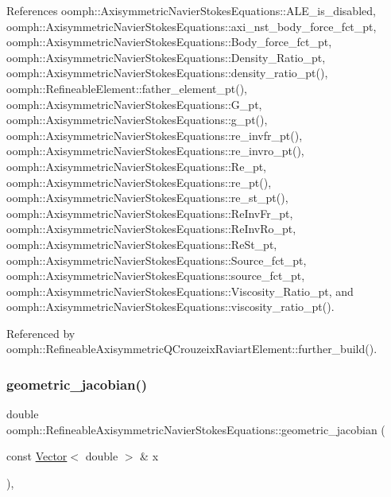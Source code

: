 References oomph\+::\+Axisymmetric\+Navier\+Stokes\+Equations\+::\+A\+L\+E\+\_\+is\+\_\+disabled, oomph\+::\+Axisymmetric\+Navier\+Stokes\+Equations\+::axi\+\_\+nst\+\_\+body\+\_\+force\+\_\+fct\+\_\+pt, oomph\+::\+Axisymmetric\+Navier\+Stokes\+Equations\+::\+Body\+\_\+force\+\_\+fct\+\_\+pt, oomph\+::\+Axisymmetric\+Navier\+Stokes\+Equations\+::\+Density\+\_\+\+Ratio\+\_\+pt, oomph\+::\+Axisymmetric\+Navier\+Stokes\+Equations\+::density\+\_\+ratio\+\_\+pt(), oomph\+::\+Refineable\+Element\+::father\+\_\+element\+\_\+pt(), oomph\+::\+Axisymmetric\+Navier\+Stokes\+Equations\+::\+G\+\_\+pt, oomph\+::\+Axisymmetric\+Navier\+Stokes\+Equations\+::g\+\_\+pt(), oomph\+::\+Axisymmetric\+Navier\+Stokes\+Equations\+::re\+\_\+invfr\+\_\+pt(), oomph\+::\+Axisymmetric\+Navier\+Stokes\+Equations\+::re\+\_\+invro\+\_\+pt(), oomph\+::\+Axisymmetric\+Navier\+Stokes\+Equations\+::\+Re\+\_\+pt, oomph\+::\+Axisymmetric\+Navier\+Stokes\+Equations\+::re\+\_\+pt(), oomph\+::\+Axisymmetric\+Navier\+Stokes\+Equations\+::re\+\_\+st\+\_\+pt(), oomph\+::\+Axisymmetric\+Navier\+Stokes\+Equations\+::\+Re\+Inv\+Fr\+\_\+pt, oomph\+::\+Axisymmetric\+Navier\+Stokes\+Equations\+::\+Re\+Inv\+Ro\+\_\+pt, oomph\+::\+Axisymmetric\+Navier\+Stokes\+Equations\+::\+Re\+St\+\_\+pt, oomph\+::\+Axisymmetric\+Navier\+Stokes\+Equations\+::\+Source\+\_\+fct\+\_\+pt, oomph\+::\+Axisymmetric\+Navier\+Stokes\+Equations\+::source\+\_\+fct\+\_\+pt, oomph\+::\+Axisymmetric\+Navier\+Stokes\+Equations\+::\+Viscosity\+\_\+\+Ratio\+\_\+pt, and oomph\+::\+Axisymmetric\+Navier\+Stokes\+Equations\+::viscosity\+\_\+ratio\+\_\+pt().



Referenced by oomph\+::\+Refineable\+Axisymmetric\+Q\+Crouzeix\+Raviart\+Element\+::further\+\_\+build().

\mbox{\label{classoomph_1_1RefineableAxisymmetricNavierStokesEquations_a2821817758a676f37d3bfe4629620b71}} 
\subsubsection{\texorpdfstring{geometric\+\_\+jacobian()}{geometric\_jacobian()}}
{\footnotesize\ttfamily double oomph\+::\+Refineable\+Axisymmetric\+Navier\+Stokes\+Equations\+::geometric\+\_\+jacobian (\begin{DoxyParamCaption}\item[{const \hyperlink{classoomph_1_1Vector}{Vector}$<$ double $>$ \&}]{x }\end{DoxyParamCaption})\hspace{0.3cm}{\ttfamily [inline]}, {\ttfamily [virtual]}}



